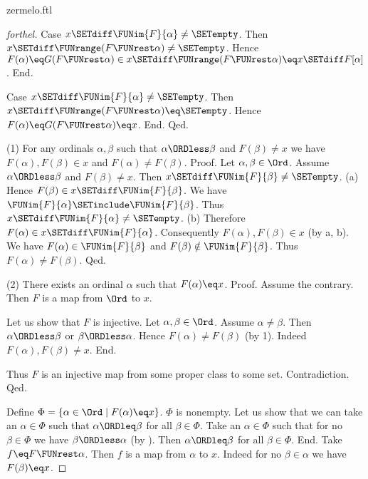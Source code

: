 \documentclass{naproche-library}
\begin{document}
\begin{smodule}[title=Zermelo's Well-Ordering Theorem]{zermelo.ftl}
\begin{proof}[forthel]
    Case $x \SETdiff \FUNim{F}{\alpha} \neq \SETempty$.
      Then $x \SETdiff \FUNrange(F \FUNrest \alpha) \neq \SETempty$.
      Hence $F(\alpha)
        \eq G(F \FUNrest \alpha)
        \in x \SETdiff \FUNrange(F \FUNrest \alpha)
        \eq x \SETdiff F[\alpha]$.
    End.

    Case $x \SETdiff \FUNim{F}{\alpha} \neq \SETempty$.
      Then $x \SETdiff \FUNrange(F \FUNrest \alpha) \eq \SETempty$.
      Hence $F(\alpha)
        \eq G(F \FUNrest \alpha)
        \eq x$.
    End.
  Qed.

  (1) For any ordinals $\alpha, \beta$ such that $\alpha \ORDless \beta$ and $F(\beta) \neq x$ we have $F(\alpha), F(\beta) \in x$ and $F(\alpha) \neq F(\beta)$. \newline
  Proof.
    Let $\alpha, \beta \in \Ord$.
    Assume $\alpha \ORDless \beta$ and $F(\beta) \neq x$.
    Then $x \SETdiff \FUNim{F}{\beta} \neq \SETempty$.
    (a) Hence $F(\beta) \in x \SETdiff \FUNim{F}{\beta}$.
    We have $\FUNim{F}{\alpha} \SETinclude \FUNim{F}{\beta}$.
    Thus $x \SETdiff \FUNim{F}{\alpha} \neq \SETempty$.
    (b) Therefore $F(\alpha) \in x \SETdiff \FUNim{F}{\alpha}$.
    Consequently $F(\alpha), F(\beta) \in x$ (by a, b).
    We have $F(\alpha) \in \FUNim{F}{\beta}$ and $F(\beta) \notin \FUNim{F}{\beta}$.
    Thus $F(\alpha) \neq F(\beta)$.
  Qed.

  (2) There exists an ordinal $\alpha$ such that $F(\alpha) \eq x$. \newline
  Proof.
    Assume the contrary.
    Then $F$ is a map from $\Ord$ to $x$.

    Let us show that $F$ is injective.
      Let $\alpha, \beta \in \Ord$.
      Assume $\alpha \neq \beta$.
      Then $\alpha \ORDless \beta$ or $\beta \ORDless \alpha$.
      Hence $F(\alpha) \neq F(\beta)$ (by 1).
      Indeed $F(\alpha), F(\beta) \neq x$.
    End.

    Thus $F$ is an injective map from some proper class to some set.
    Contradiction.
  Qed.

  Define $\Phi = \{ \alpha \in \Ord \mid F(\alpha) \eq x \}$.
  $\Phi$ is nonempty.
  Let us show that we can take an $\alpha \in \Phi$ such that $\alpha \ORDleq \beta$ for all $\beta \in \Phi$.
    Take an $\alpha \in \Phi$ such that for no $\beta \in \Phi$ we have $\beta \ORDless \alpha$ (by ).
    Then $\alpha \ORDleq \beta$ for all $\beta \in \Phi$.
  End.
  Take $f \eq F \FUNrest \alpha$.
  Then $f$ is a map from $\alpha$ to $x$.
  Indeed for no $\beta \in \alpha$ we have $F(\beta) \eq x$.


\end{proof}
\end{smodule}
\end{document}
